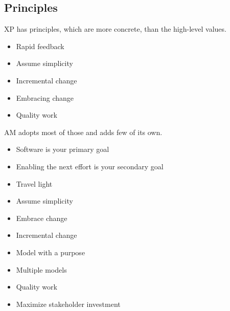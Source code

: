 \subsection{Principles}
XP has principles, which are more concrete, than the high-level values.
\begin{itemize}
  \item Rapid feedback
  \item Assume simplicity
  \item Incremental change
  \item Embracing change
  \item Quality work\cite{BeckAndres200411}
\end{itemize}
AM adopts most of those and adds few of its own.
\begin{itemize}
  \item Software is your primary goal
  \item Enabling the next effort is your secondary goal
  \item Travel light
  \item Assume simplicity
  \item Embrace change
  \item Incremental change
  \item Model with a purpose
  \item Multiple models
  \item Quality work
  \item Maximize stakeholder investment\cite{Ambler200204}
\end{itemize}
